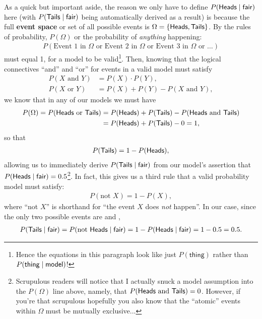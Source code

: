 As a quick but important aside, the reason we only have to define $P(\textsf{Heads}{} \; | \;{} \textsf{fair}{})$ here (with $P(\textsf{Tails}{} \; | \;{} \textsf{fair}{})$ being automatically derived as a result) is because the full \textbf{event space} or set of all possible events is $\Omega = \{\textsf{Heads}{}, \textsf{Tails}{}\}$. By the rules of probability, $P(\Omega)$ or the probability of \textit{anything} happening:
\begin{align*}
P(\text{Event 1 in  }\Omega\text{ or Event 2 in }\Omega\text{ or Event 3 in }\Omega\text{ or }\ldots)
\end{align*} must equal 1, for a model to be valid\footnote{Hence the equations in this paragraph look like just $P(\textsf{thing})$ rather than $P(\textsf{thing} \; | \;{} \textsf{model})$!}. Then, knowing that the logical connectives ``and'' and ``or'' for events in a valid model must satisfy
\begin{align*}
P(X\text{ and }Y) &= P(X)\cdot P(Y), \\
P(X\text{ or }Y) &= P(X) + P(Y) - P(X\text{ and }Y),
\end{align*}
we know that in any of our models we must have
\begin{align*}
P(\Omega) = P(\textsf{Heads}{}\text{ or }\textsf{Tails}{}) &= P(\textsf{Heads}{}) + P(\textsf{Tails}{}) - P(\textsf{Heads}{}\text{ and }\textsf{Tails}{}) \\
&= P(\textsf{Heads}{}) + P(\textsf{Tails}{}) - 0 = 1,
\end{align*}
so that
\begin{align*}
P(\textsf{Tails}{}) = 1 - P(\textsf{Heads}{}),
\end{align*}
allowing us to immediately derive $P(\textsf{Tails}{} \; | \;{} \textsf{fair}{})$ from our model's assertion that $P(\textsf{Heads}{} \; | \;{} \textsf{fair}{}) = 0.5$\footnote{Scrupulous readers will notice that I actually snuck a model assumption into the $P(\Omega)$ line above, namely, that $P(\textsf{Heads}{}\text{ and }\textsf{Tails}{}) = 0$. However, if you're that scrupulous hopefully you also know that the ``atomic'' events within $\Omega$ must be mutually exclusive...}. In fact, this gives us a third rule that a valid probability model must satisfy:
\begin{align*}
P(\text{not }X) = 1 - P(X),
\end{align*}
where ``not $X$'' is shorthand for ``the event $X$ does \textit{not} happen''. In our case, since the only two possible events are \Heads{} and \Tails{},
\begin{align*}
P(\textsf{Tails}{} \; | \;{} \textsf{fair}{}) = P(\text{not }\textsf{Heads}{}\; | \;{}\textsf{fair}{}) = 1 - P(\textsf{Heads}{} \; | \;{} \textsf{fair}{}) = 1 - 0.5 = 0.5.
\end{align*}

